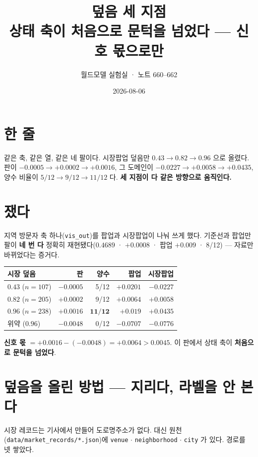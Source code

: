 \documentclass[10pt,a4paper]{article}
\title{\bfseries 덮음 세 지점\\[2pt]
\large 상태 축이 처음으로 문턱을 넘었다 --- 신호 몫으로만}
\author{월드모델 실험실 · 노트 660--662}
\date{2026-08-06}
\begin{document}
\maketitle

\section{한 줄}

같은 축, 같은 열, 같은 네 팔이다. 시장팝업 덮음만 $0.43 \to 0.82 \to 0.96$ 으로
올렸다. 판이 $-0.0005 \to +0.0002 \to +0.0016$, 그 도메인이
$-0.0227 \to +0.0058 \to +0.0435$, 양수 비율이 $5/12 \to 9/12 \to 11/12$ 다.
\textbf{세 지점이 다 같은 방향으로 움직인다.}

\section{쟀다}

지역 방문자 축 하나(\verb|vis_out|)를 팝업과 시장팝업이 나눠 쓰게 했다. 기준선과
팝업만 팔이 \textbf{네 번 다} 정확히 재현됐다($0.4689$ · $+0.0008$ · 팝업
$+0.009$ · 8/12) --- 자료만 바뀌었다는 증거다.

\begin{center}\small
\begin{tabular}{lrrrr}\toprule
시장 덮음 & 판 & 양수 & 팝업 & 시장팝업 \\ \midrule
$0.43$ ($n{=}107$) & $-0.0005$ & 5/12 & $+0.0201$ & $\mathbf{-0.0227}$ \\
$0.82$ ($n{=}205$) & $+0.0002$ & 9/12 & $+0.0064$ & $+0.0058$ \\
$\mathbf{0.96}$ ($n{=}238$) & $\mathbf{+0.0016}$ & $\mathbf{11/12}$ & $+0.019$ & $\mathbf{+0.0435}$ \\
위약 ($0.96$) & $-0.0048$ & 0/12 & $-0.0707$ & $-0.0776$ \\ \bottomrule
\end{tabular}\end{center}

\textbf{신호 몫} $= +0.0016 - (-0.0048) = \mathbf{+0.0064} > 0.0045$.
이 판에서 상태 축이 \textbf{처음으로 문턱을 넘었다}.

\section{덮음을 올린 방법 --- 지리다, 라벨을 안 본다}

시장 레코드는 기사에서 만들어 도로명주소가 없다. 대신 원천
(\verb|data/market_records/*.json|)에 \verb|venue| $\cdot$ \verb|neighborhood|
$\cdot$ \verb|city| 가 있다. 경로를 넷 쌓았다.
\end{document}
